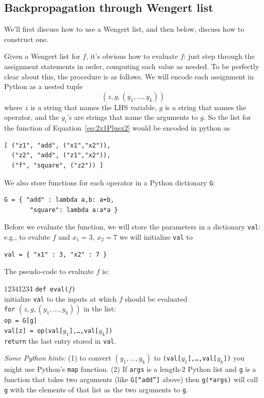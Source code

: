 \documentclass[12pt]{article}
\newcommand{\cd}[1]{\texttt{#1}}
\begin{document}
\subsection{Backpropagation through Wengert list}

We'll first discuss how to use a Wengert list, and then below, discuss
how to construct one.

Given a Wengert list for $f$, it's obvious how to evaluate $f$: just
step through the assignment statements in order, computing each value
as needed.  To be perfectly clear about this, the procedure is as
follows.  We will encode each assignment in Python as a nested tuple
\[ (z, g, (y_1,\ldots,y_k))
\]
where $z$ is a string that names the LHS variable, $g$ is a string
that names the operator, and the $y_i$'s are strings that name the
arguments to $g$.  So the list for the function of
Equation~\ref{eq:2x1Plusx2} would be encoded in python as
\begin{verbatim}
[ ("z1", "add", ("x1","x2")), 
  ("z2", "add", ("z1","x2")), 
  ("f", "square", ("z2")) ]
\end{verbatim}
We also store functions for each operator in a Python dictionary
\cd{G}:
\begin{verbatim}
G = { "add" : lambda a,b: a+b, 
       "square": lambda a:a*a }
\end{verbatim}
Before we evaluate the function, we will store the parameters in a
dictionary \cd{val}: e.g., to evalute $f$ and $x_1=3$, $x_2=7$
we will initialize \cd{val} to 
\begin{verbatim}
val = { "x1" : 3, "x2" : 7 }
\end{verbatim}

The pseudo-code to evaluate $f$ is:

\begin{tabbing}1234\=1234\=\kill
\cd{def eval($f$)} \\
\> initialize \cd{val} to the inputs at which $f$ should be evaluated\\
\> \cd{for} $(z,g,(y_1,\ldots,y_k))$ in the list:\\
\>     \> \cd{op = G[g]} \\
\>     \> \cd{val[z] = op(val[$y_1$],\ldots,val[$y_k$])}\\
\> \cd{return} the last entry stored in \cd{val}.
\end{tabbing}

\textit{Some Python hints:} (1) to convert $(y_1,\ldots,y_k)$ to
\cd{(val[$y_1$],\ldots,val[$y_k$])} you might use Python's \cd{map}
function. (2) If \cd{args} is a length-2 Python list and \cd{g} is a
function that takes two arguments (like \cd{G[``add'']} above) then
\cd{g(*args)} will call \cd{g} with the elements of that list as the
two arguments to \cd{g}.
\end{document}
